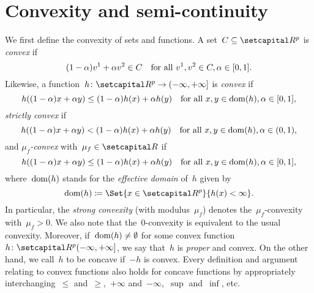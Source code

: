 \documentclass[../main]{subfiles}
\begin{document}
\section{Convexity and semi-continuity} 
We first define the convexity of sets and functions.
A set~$C \subseteq \setR^p$ is \emph{convex} if
\begin{equation}
    (1 - \alpha) v^1 + \alpha v^2 \in C \quad \text{for all~$v^1, v^2 \in C, \alpha \in [0, 1]$}
.\end{equation} 
Likewise, a function~$h \colon \setR^p \to (-\infty, +\infty]$ is \emph{convex} if
\begin{equation}
    h((1 - \alpha) x + \alpha y) \le (1 - \alpha) h(x) + \alpha h(y) \quad \text{for all~$x, y \in \operatorname{dom}(h), \alpha \in [0, 1]$}
,\end{equation}
\emph{strictly convex} if
\begin{equation}
    h((1 - \alpha) x + \alpha y) < (1 - \alpha) h(x) + \alpha h(y) \quad \text{for all~$x, y \in \operatorname{dom}(h), \alpha \in (0, 1)$}
,\end{equation} 
and \emph{$\mu_f$-convex} with~$\mu_f \in \setR$ if
\begin{equation}
    h((1 - \alpha) x + \alpha y) \le (1 - \alpha) h(x) + \alpha h(y) \quad \text{for all~$x, y \in \operatorname{dom}(h), \alpha \in [0, 1]$}
,\end{equation} 
where~$\operatorname{dom}(h)$ stands for the \emph{effective domain} of~$h$ given by
\begin{equation}
    \dom(h) \coloneqq \Set{x \in \setR^p}{h(x) < \infty}
.\end{equation} 
In particular, the \emph{strong convexity} (with modulus~$\mu_f$) denotes the~$\mu_f$-convexity with~$\mu_f > 0$.
We also note that the~$0$-convexity is equivalent to the usual convexity.
Moreover, if~$\operatorname{dom}(h) \neq \emptyset$ for some convex function~$h \colon \setR^p (- \infty, + \infty]$, we say that~$h$ is \emph{proper} and convex.
On the other hand, we call~$h$ to be concave if~$- h$ is convex.
Every definition and argument relating to convex functions also holds for concave functions by appropriately interchanging~$\le$ and~$\ge$,~$+ \infty$ and~$- \infty$,~$\sup$ and~$\inf$, etc.
\end{document}
